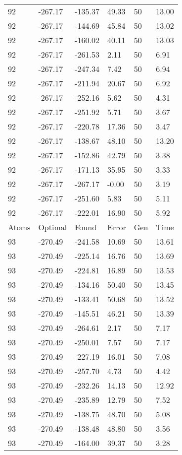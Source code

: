 \documentclass{report}
\begin{document}
\begin{appendix}
\begin{longtable}{llllll}
92 & -267.17 & -135.37 & 49.33 & 50 & 13.00 \\
92 & -267.17 & -144.69 & 45.84 & 50 & 13.02 \\
92 & -267.17 & -160.02 & 40.11 & 50 & 13.03 \\
92 & -267.17 & -261.53 & 2.11 & 50 & 6.91 \\
92 & -267.17 & -247.34 & 7.42 & 50 & 6.94 \\
92 & -267.17 & -211.94 & 20.67 & 50 & 6.92 \\
92 & -267.17 & -252.16 & 5.62 & 50 & 4.31 \\
92 & -267.17 & -251.92 & 5.71 & 50 & 3.67 \\
92 & -267.17 & -220.78 & 17.36 & 50 & 3.47 \\
92 & -267.17 & -138.67 & 48.10 & 50 & 13.20 \\
92 & -267.17 & -152.86 & 42.79 & 50 & 3.38 \\
92 & -267.17 & -171.13 & 35.95 & 50 & 3.33 \\
92 & -267.17 & -267.17 & -0.00 & 50 & 3.19 \\
92 & -267.17 & -251.60 & 5.83 & 50 & 5.11 \\
92 & -267.17 & -222.01 & 16.90 & 50 & 5.92 \\
Atoms & Optimal & Found & Error & Gen & Time \\
93 & -270.49 & -241.58 & 10.69 & 50 & 13.61 \\
93 & -270.49 & -225.14 & 16.76 & 50 & 13.69 \\
93 & -270.49 & -224.81 & 16.89 & 50 & 13.53 \\
93 & -270.49 & -134.16 & 50.40 & 50 & 13.45 \\
93 & -270.49 & -133.41 & 50.68 & 50 & 13.52 \\
93 & -270.49 & -145.51 & 46.21 & 50 & 13.39 \\
93 & -270.49 & -264.61 & 2.17 & 50 & 7.17 \\
93 & -270.49 & -250.01 & 7.57 & 50 & 7.17 \\
93 & -270.49 & -227.19 & 16.01 & 50 & 7.08 \\
93 & -270.49 & -257.70 & 4.73 & 50 & 4.42 \\
93 & -270.49 & -232.26 & 14.13 & 50 & 12.92 \\
93 & -270.49 & -235.89 & 12.79 & 50 & 7.52 \\
93 & -270.49 & -138.75 & 48.70 & 50 & 5.08 \\
93 & -270.49 & -138.48 & 48.80 & 50 & 3.56 \\
93 & -270.49 & -164.00 & 39.37 & 50 & 3.28 \\

\end{longtable}
\end{appendix}
\end{document}
